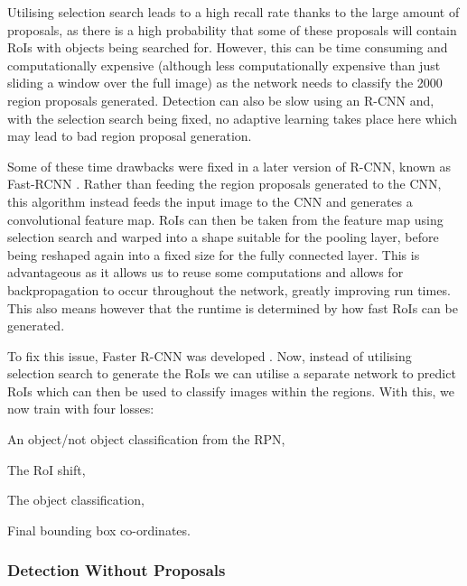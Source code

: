 Utilising selection search leads to a high recall rate thanks to the large amount of proposals, as there is a high probability that some of these proposals will contain RoIs with objects being searched for. However, this can be time consuming and computationally expensive (although less computationally expensive than just sliding a window over the full image) as the network needs to classify the 2000 region proposals generated. Detection can also be slow using an R-CNN and, with the selection search being fixed, no adaptive learning takes place here which may lead to bad region proposal generation. 

Some of these time drawbacks were fixed in a later version of R-CNN, known as Fast-RCNN \cite{girshick_fast_2015}. Rather than feeding the region proposals generated to the CNN, this algorithm instead feeds the input image to the CNN and generates a convolutional feature map. RoIs can then be taken from the feature map using selection search and warped into a shape suitable for the pooling layer, before being reshaped again into a fixed size for the fully connected layer. This is advantageous as it allows us to reuse some computations and allows for backpropagation to occur throughout the network, greatly improving run times.  This also means however that the runtime is determined by how fast RoIs can be generated. 

To fix this issue, Faster R-CNN was developed \cite{ren_faster_2015}. Now, instead of utilising selection search to generate the RoIs we can utilise a separate network to predict RoIs which can then be used to classify images within the regions. With this, we now train with four losses: 

\begin{enumerate*}
	\item An object/not object classification from the RPN,
	\item The RoI shift,
	\item The object classification,
	\item Final bounding box co-ordinates.
\end{enumerate*}

\subsubsection{Detection Without Proposals}\label{ch:Background,sec:objectDetection,sub:noProposals}

